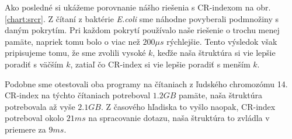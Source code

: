 Ako posledné si ukážeme porovnanie nášho riešenia s CR-indexom na obr. \ref{chart:srcr}.
Z čítaní z baktérie \emph{E.coli} sme náhodne povyberali podmnožiny s daným pokrytím. Pri každom
pokrytí používalo naše riešenie o trochu menej pamäte, napriek tomu bolo o viac než $200\mu s$
rýchlejšie. Tento výsledok však pripisujeme tomu, že sme zvolili vysoké $k$, keďže naša
štruktúra si vie lepšie poradiť s väčším $k$, zatiaľ čo CR-index si vie lepšie poradiť s menším
$k$.

Podobne sme otestovali oba programy na čítaniach z ľudského chromozómu 14. CR-index na týchto čítaniach
potreboval $1.2GB$ pamäte, naša štruktúra potrebovala až vyše $2.1GB$. Z časového hľadiska
to vyšlo naopak, CR-index potreboval okolo $21ms$ na spracovanie dotazu, naša štruktúra
to zvládla v priemere za $9ms$.
